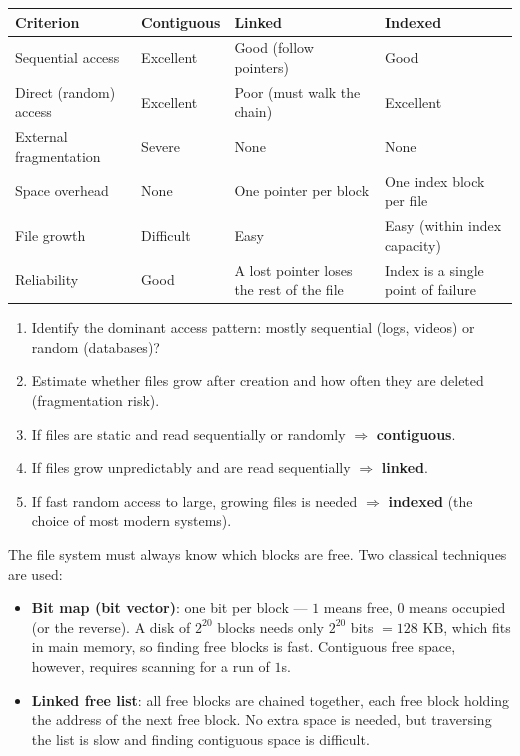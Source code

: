 \documentclass[11pt]{article}
\newcounter{popsec}
\newcounter{popsub}
\newcommand{\courssub}[1]{%
  \stepcounter{popsub}%
  \par\vspace{9pt}\noindent{\popxbold\fontsize{11.5}{13}\selectfont\color{popink}{\color{poporange}\thepopsec.\thepopsub}\hspace{6pt}#1}\par\nopagebreak\vspace{4pt}
}
\begin{document}
\begin{center}
\begin{tabularx}{\linewidth}{|l|X|X|X|}
\hline
\rowcolor{popblueL} \textbf{Criterion} & \textbf{Contiguous} & \textbf{Linked} & \textbf{Indexed} \\
\hline
Sequential access & Excellent & Good (follow pointers) & Good \\
\hline
Direct (random) access & Excellent & Poor (must walk the chain) & Excellent \\
\hline
External fragmentation & Severe & None & None \\
\hline
Space overhead & None & One pointer per block & One index block per file \\
\hline
File growth & Difficult & Easy & Easy (within index capacity) \\
\hline
Reliability & Good & A lost pointer loses the rest of the file & Index is a single point of failure \\
\hline
\end{tabularx}
\end{center}

\begin{methode}
\begin{enumerate}
\item Identify the dominant access pattern: mostly sequential (logs, videos) or random (databases)?
\item Estimate whether files grow after creation and how often they are deleted (fragmentation risk).
\item If files are static and read sequentially or randomly $\Rightarrow$ \textbf{contiguous}.
\item If files grow unpredictably and are read sequentially $\Rightarrow$ \textbf{linked}.
\item If fast random access to large, growing files is needed $\Rightarrow$ \textbf{indexed} (the choice of most modern systems).
\end{enumerate}
\end{methode}

\courssub{Free-Space Management}

The file system must always know which blocks are free. Two classical techniques are used:

\begin{itemize}
\item \textbf{Bit map (bit vector)}: one bit per block — $1$ means free, $0$ means occupied (or the reverse). A disk of $2^{20}$ blocks needs only $2^{20}$ bits $= 128$ KB, which fits in main memory, so finding free blocks is fast. Contiguous free space, however, requires scanning for a run of $1$s.
\item \textbf{Linked free list}: all free blocks are chained together, each free block holding the address of the next free block. No extra space is needed, but traversing the list is slow and finding contiguous space is difficult.
\end{itemize}
\end{document}
